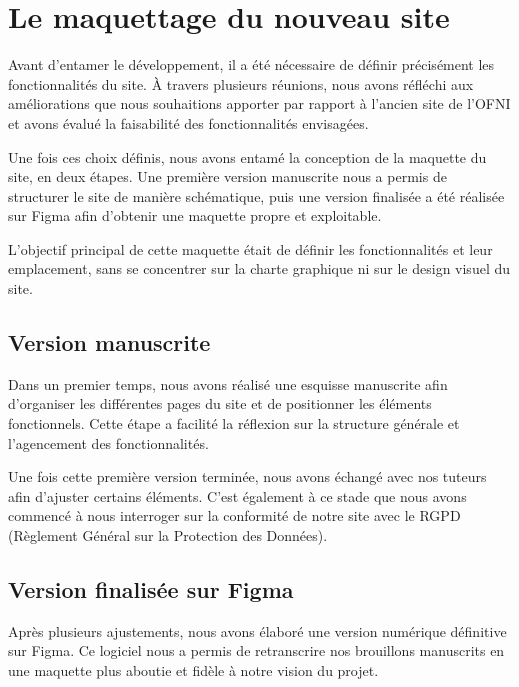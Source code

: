 \section{Le maquettage du nouveau site}


Avant d’entamer le développement, il a été nécessaire de définir précisément les fonctionnalités du site. À travers plusieurs réunions, nous avons réfléchi aux améliorations que nous souhaitions apporter par rapport à l’ancien site de l’OFNI et avons évalué la faisabilité des fonctionnalités envisagées.

Une fois ces choix définis, nous avons entamé la conception de la maquette du site, en deux étapes. Une première version manuscrite nous a permis de structurer le site de manière schématique, puis une version finalisée a été réalisée sur Figma afin d’obtenir une maquette propre et exploitable.

L’objectif principal de cette maquette était de définir les fonctionnalités et leur emplacement, sans se concentrer sur la charte graphique ni sur le design visuel du site.

\subsection{Version manuscrite}

Dans un premier temps, nous avons réalisé une esquisse manuscrite afin d’organiser les différentes pages du site et de positionner les éléments fonctionnels. Cette étape a facilité la réflexion sur la structure générale et l'agencement des fonctionnalités.


Une fois cette première version terminée, nous avons échangé avec nos tuteurs afin d’ajuster certains éléments. C’est également à ce stade que nous avons commencé à nous interroger sur la conformité de notre site avec le RGPD (Règlement Général sur la Protection des Données).

\subsection{Version finalisée sur Figma}

Après plusieurs ajustements, nous avons élaboré une version numérique définitive sur Figma. Ce logiciel nous a permis de retranscrire nos brouillons manuscrits en une maquette plus aboutie et fidèle à notre vision du projet.

